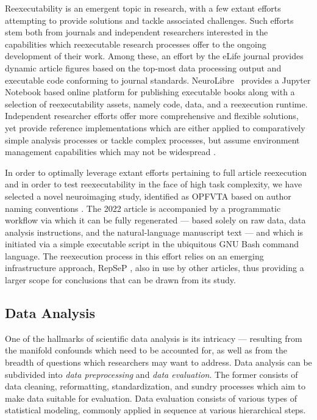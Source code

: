 Reexecutability is an emergent topic in research, with a few extant efforts attempting to provide solutions and tackle associated challenges.
Such efforts stem both from journals and independent researchers interested in the capabilities which reexecutable research processes offer to the ongoing development of their work.
Among these, an effort by the eLife journal \cite{eliferep} provides dynamic article figures based on the top-most data processing output and executable code conforming to journal standards.
NeuroLibre~\cite{neurolibre} provides a Jupyter Notebook based online platform for publishing executable books along with a selection of reexecutability assets, namely code, data, and a reexecution runtime.
Independent researcher efforts offer more comprehensive and flexible solutions, yet provide reference implementations which are either applied to comparatively simple analysis processes \cite{Dar2019} or tackle complex processes, but assume environment management capabilities which may not be widespread \cite{repsep}.

In order to optimally leverage extant efforts pertaining to full article reexecution and in order to test reexecutability in the face of high task complexity, we have selected a novel neuroimaging study, identified as OPFVTA based on author naming conventions \cite{opfvta}.
The 2022 article is accompanied by a programmatic workflow via which it can be fully regenerated — based solely on raw data, data analysis instructions, and the natural-language manuscript text — and which is initiated via a simple executable script in the ubiquitous GNU Bash \cite{bash} command language.
The reexecution process in this effort relies on an emerging infrastructure approach, RepSeP \cite{repsep}, also in use by other articles, thus providing a larger scope for conclusions that can be drawn from its study.


\subsection{Data Analysis}

One of the hallmarks of scientific data analysis is its intricacy — resulting from the manifold confounds which need to be accounted for, as well as from the breadth of questions which researchers may want to address.
Data analysis can be subdivided into \emph{data preprocessing} and \emph{data evaluation}.
The former consists of data cleaning, reformatting, standardization, and sundry processes which aim to make data suitable for evaluation.
Data evaluation consists of various types of statistical modeling, commonly applied in sequence at various hierarchical steps.

